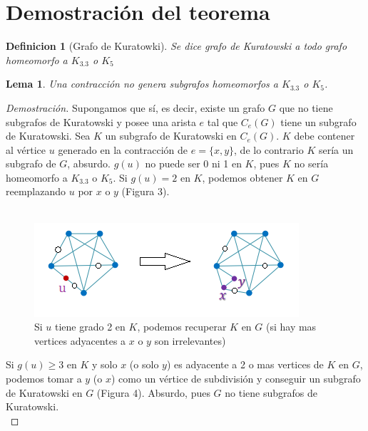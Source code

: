 \documentclass{article}
\newtheorem{lemma}{Lema}
\newtheorem*{definition}{Definicion}
\begin{document}
\section*{Demostración del teorema}
\begin{definition}[Grafo de Kuratowki]
Se dice grafo de Kuratowski a todo grafo homeomorfo a $K_{3.3}$ o $K_5$
\end{definition}
\begin{lemma}
Una contracción no genera subgrafos homeomorfos a $K_{3.3}$ o $K_5$.
\end{lemma}
\begin{proof}[Demostración]
Supongamos que sí, es decir, existe un grafo $G$ que no tiene subgrafos de Kuratowski y posee una arista $e$ tal que $C_e(G)$ tiene un subgrafo de Kuratowski. Sea $K$ un subgrafo de Kuratowski en $C_e(G)$. $K$ debe contener al vértice $u$ generado en la contracción de $e = \{x, y\}$, de lo contrario $K$ sería un subgrafo de $G$, absurdo. $g(u)$ no puede ser 0 ni 1 en $K$, pues $K$ no sería homeomorfo a  $K_{3.3}$ o $K_5$.  Si $g(u) = 2$ en $K$, podemos obtener $K$ en $G$ reemplazando $u$ por $x$ o $y$ (Figura 3).\\ \\

\begin{figure}[htp]
\centering
\includegraphics{img/kura5}
\caption{Si $u$ tiene grado 2 en $K$, podemos recuperar $K$ en $G$ (si hay mas vertices adyacentes a $x$ o $y$ son irrelevantes)}
\label{fig:kura1}
\end{figure}

Si $g(u) \ge 3$ en $K$ y solo $x$ (o solo $y$) es adyacente a 2 o mas vertices de $K$ en $G$, podemos tomar a $y$ (o $x$) como un vértice de subdivisión y conseguir un subgrafo de Kuratowski en $G$ (Figura 4). Absurdo, pues $G$ no tiene subgrafos de Kuratowski. \\


\end{proof}
\end{document}
